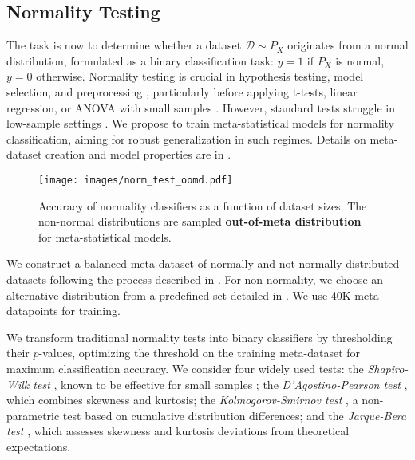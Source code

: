 \subsection{Normality Testing}
The task is now to determine whether a dataset \( \mathcal{D} \sim P_X \) originates from a normal distribution, formulated as a binary classification task: \( y = 1 \) if \( P_X \) is normal, \( y = 0 \) otherwise. Normality testing is crucial in hypothesis testing, model selection, and preprocessing \cite{shapiro1965analysis, razali2011power}, particularly before applying t-tests, linear regression, or ANOVA with small samples \cite{altman1990practical, das2016brief, doi:10.4078/jrd.2019.26.1.5}. However, standard tests struggle in low-sample settings \cite{razali2011power}. We propose to train meta-statistical models for normality classification, aiming for robust generalization in such regimes. Details on meta-dataset creation and model properties are in .

\begin{figure}[t]
    \centering
    \texttt{[image: images/norm\_test\_oomd.pdf]}
    \caption{Accuracy of normality classifiers as a function of dataset sizes. The non-normal distributions are sampled \textbf{out-of-meta distribution} for meta-statistical models.}
    \label{fig:norm_t_oomd}
    \vspace{-0.5cm}
\end{figure}


We construct a balanced meta-dataset of normally and not normally distributed datasets following the process described in . For non-normality, we choose an alternative distribution from a predefined set detailed in . We use 40K meta datapoints for training. 

We transform traditional normality tests into binary classifiers by thresholding their \( p \)-values, optimizing the threshold on the training meta-dataset for maximum classification accuracy. We consider four widely used tests: the \textit{Shapiro-Wilk test} \cite{shapiro1965analysis}, known to be effective for small samples \cite{razali2011power}; the \textit{D'Agostino-Pearson test} \cite{d1973tests}, which combines skewness and kurtosis; the \textit{Kolmogorov-Smirnov test} \cite{massey1951kolmogorov}, a non-parametric test based on cumulative distribution differences; and the \textit{Jarque-Bera test} \cite{jarque1987test}, which assesses skewness and kurtosis deviations from theoretical expectations.

